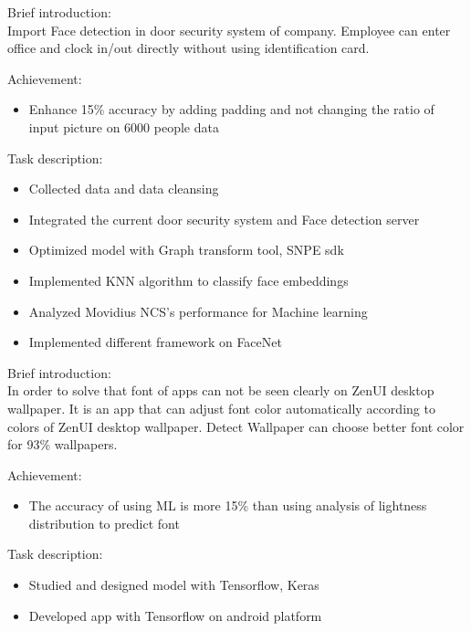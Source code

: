 \documentclass{resume}
\begin{document}
\begin{description}
\item Brief introduction:\\
Import Face detection in door security system of company. Employee can enter office and clock in/out directly without using identification card.\\
\item Achievement:
\begin{itemize}
  \item Enhance 15\% accuracy by adding padding and not changing the ratio of input picture on 6000 people data
\end{itemize}
\item Task description:
\begin{itemize}
  \item Collected data and data cleansing
  \item Integrated the current door security system and Face detection server
  \item Optimized model with Graph transform tool, SNPE sdk
  \item Implemented KNN algorithm to classify face embeddings
  \item Analyzed Movidius NCS's performance for Machine learning
  \item Implemented different framework on FaceNet
\end{itemize}
\end{description}
 {}
\begin{description}
\item Brief introduction:\\
In order to solve that font of apps can not be seen clearly on ZenUI desktop wallpaper. It is an app that can adjust font color automatically according to colors of ZenUI desktop wallpaper. Detect Wallpaper can choose better font color for 93\% wallpapers.\\
\item Achievement:
\begin{itemize}
  \item The accuracy of using ML is more 15\% than using analysis of lightness distribution to predict font 
\end{itemize}
\item Task description:
\begin{itemize}
  \item Studied and designed model with Tensorflow, Keras
  \item Developed app with Tensorflow on android platform 
\end{itemize}
\end{description}
\end{document}
